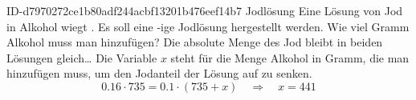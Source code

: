 \begin{exercise}
      {ID-d7970272ce1b80adf244acbf13201b476eef14b7}
      {Jodlösung}
  \ifproblem\problem
    Eine Lösung von  Jod in Alkohol wiegt .
    Es soll eine -ige Jodlösung hergestellt werden.
    Wie viel Gramm Alkohol muss man hinzufügen?
  \fi
  \ifoutline\outline
    Die absolute Menge des Jod bleibt in beiden Lösungen gleich\ldots
  \fi
  \ifoutcome\outcome
    Die Variable $x$ steht für die Menge Alkohol in Gramm, die man hinzufügen
    muss, um den Jodanteil der Lösung auf  zu senken.
    \begin{equation*}
      \num{0.16}\cdot 735=\num{0.1}\cdot(735+x)
      \quad\Rightarrow\quad
      x=441
    \end{equation*}
  \fi
\end{exercise}
